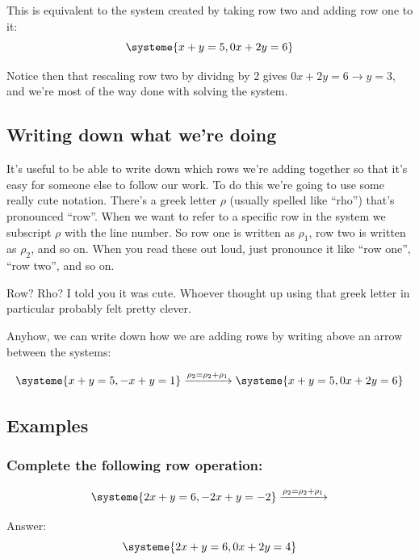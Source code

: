 \documentclass[a4paper,twoside,12pt]{memoir}  %
\begin{document}
This is equivalent to the system created by taking row two and adding row one to it:
\begin{equation*}
  \systeme{
     x +  y = 5,
    0x + 2y = 6
  }
\end{equation*}

Notice then that rescaling row two by dividng by 2 gives $0x + 2y = 6 \rightarrow y = 3$, and we're most of the way done with solving the system.

\subsection{Writing down what we're doing}
It's useful to be able to write down which rows we're adding together so that it's easy for someone else to follow
our work.
To do this we're going to use some really cute notation.
There's a greek letter $\rho$ (usually spelled like ``rho'') that's pronounced ``row''.
When we want to refer to a specific row in the system we subscript $\rho$ with the line number.
So row one is written as $\rho_1$, row two is written as $\rho_2$, and so on.
When you read these out loud, just pronounce it like ``row one'', ``row two'', and so on.

Row? Rho? I told you it was cute. Whoever thought up using that greek letter in particular probably felt pretty clever.

Anyhow, we can write down how we are adding rows by writing above an arrow between the systems:

\begin{equation*}
  \systeme{
     x + y = 5,
    -x + y = 1
  }
  \xrightarrow{\rho_2 = \rho_2 + \rho_1}
  \systeme{
     x +  y = 5,
    0x + 2y = 6
  }
\end{equation*}

\subsection{Examples}
\subsubsection{Complete the following row operation:}
\begin{equation*}
  \systeme{
     2x + y = 6,
    -2x + y = -2
  }
  \xrightarrow{\rho_2 = \rho_2 + \rho_1}
\end{equation*}

Answer:
\begin{equation*}
  \systeme{
    2x +  y = 6,
    0x + 2y = 4
  }
\end{equation*}
\end{document}
